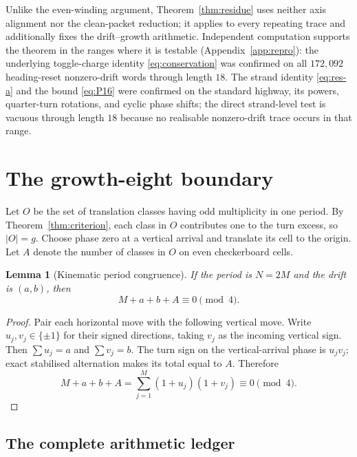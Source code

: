 \documentclass[11pt,letterpaper]{article}
\theoremstyle{plain}
\newtheorem{lemma}[theorem]{Lemma}
\theoremstyle{definition}
\newcommand{\growth}{g}
\begin{document}
\begin{NoHyper}
Unlike the even-winding argument, Theorem~\ref{thm:residue} uses neither axis
alignment nor the clean-packet reduction; it applies to every repeating trace and
additionally fixes the drift--growth arithmetic. Independent computation supports the
theorem in the ranges where it is testable (Appendix~\ref{app:repro}): the underlying
toggle-charge identity \eqref{eq:conservation} was confirmed on all $172{,}092$
heading-reset nonzero-drift words through length $18$. The strand identity
\eqref{eq:res-a} and the bound \eqref{eq:P16} were confirmed on the standard highway,
its powers, quarter-turn rotations, and cyclic phase shifts; the direct strand-level
test is vacuous through
length $18$ because no realisable nonzero-drift trace occurs in that range.

\section{The growth-eight boundary}\label{sec:growth8}

Let $O$ be the set of translation classes having odd multiplicity in one
period.  By Theorem~\ref{thm:criterion}, each class in $O$ contributes one to
the turn excess, so $|O|=\growth$.  Choose phase zero at a vertical arrival and
translate its cell to the origin.  Let $A$ denote the number of classes in $O$
on even checkerboard cells.

\begin{lemma}[Kinematic period congruence]\label{lem:periodcong}
If the period is $N=2M$ and the drift is $(a,b)$, then
\begin{equation}\label{eq:periodcong}
 M+a+b+A\equiv0\pmod4.
\end{equation}
\end{lemma}

\begin{proof}
Pair each horizontal move with the following vertical move.  Write
$u_j,v_j\in\{\pm1\}$ for their signed directions, taking $v_j$ as the incoming
vertical sign.  Then $\sum u_j=a$ and $\sum v_j=b$.  The turn sign on the
vertical-arrival phase is $u_jv_j$; exact stabilised alternation makes its total
equal to $A$.  Therefore
\[
 M+a+b+A=\sum_{j=1}^{M}(1+u_j)(1+v_j)\equiv0\pmod4.
\]
\end{proof}

\subsection{The complete arithmetic ledger}


\end{NoHyper}
\end{document}
